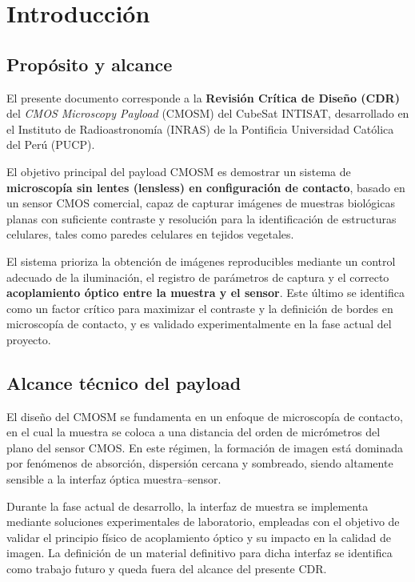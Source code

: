 \chapter{Introducción}
\label{ch:introduccion}

\section{Propósito y alcance}

El presente documento corresponde a la \textbf{Revisión Crítica de Diseño (CDR)}
del \textit{CMOS Microscopy Payload} (CMOSM) del CubeSat INTISAT, desarrollado en
el Instituto de Radioastronomía (INRAS) de la Pontificia Universidad Católica del
Perú (PUCP).

El objetivo principal del payload CMOSM es demostrar un sistema de
\textbf{microscopía sin lentes (lensless) en configuración de contacto}, basado
en un sensor CMOS comercial, capaz de capturar imágenes de muestras biológicas
planas con suficiente contraste y resolución para la identificación de
estructuras celulares, tales como paredes celulares en tejidos vegetales.

El sistema prioriza la obtención de imágenes reproducibles mediante un control
adecuado de la iluminación, el registro de parámetros de captura y el correcto
\textbf{acoplamiento óptico entre la muestra y el sensor}. Este último se
identifica como un factor crítico para maximizar el contraste y la definición
de bordes en microscopía de contacto, y es validado experimentalmente en la
fase actual del proyecto.
\section{Alcance técnico del payload}

El diseño del CMOSM se fundamenta en un enfoque de microscopía de contacto, en el
cual la muestra se coloca a una distancia del orden de micrómetros del plano del
sensor CMOS. En este régimen, la formación de imagen está dominada por fenómenos
de absorción, dispersión cercana y sombreado, siendo altamente sensible a la
interfaz óptica muestra--sensor.

Durante la fase actual de desarrollo, la interfaz de muestra se implementa
mediante soluciones experimentales de laboratorio, empleadas con el objetivo de
validar el principio físico de acoplamiento óptico y su impacto en la calidad de
imagen. La definición de un material definitivo para dicha interfaz se
identifica como trabajo futuro y queda fuera del alcance del presente CDR.

